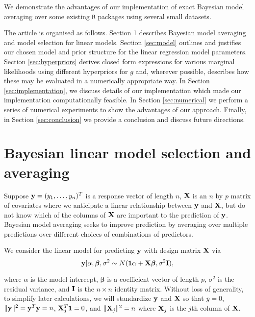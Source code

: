 \documentclass[12pt]{article}
\def\vectorfontone{\bf}
\def\vectorfonttwo{\boldsymbol}
\def\vy{{\vectorfontone y}}                      %
\def\vone{{\vectorfontone 1}}
\def\vbeta{{\vectorfonttwo \beta}}               %
\def\matrixfontone{\bf}
\def\mI{{\matrixfontone I}}                      %
\def\mX{{\matrixfontone X}}                      %
\begin{document}
\noindent 
We demonstrate the advantages of our implementation of exact Bayesian model
averaging over some existing {\tt R}
packages using several small datasets.



The article is organised as follows. Section \ref{sec:bma} describes Bayesian model averaging and model
selection for linear models. Section \ref{sec:model} outlines and justifies our chosen model and prior structure for the linear regression model parameters. Section 
\ref{sec:hyperpriors} derives closed form expressions for various marginal likelihoods using 
different hyperpriors for $g$ and, wherever possible, describes how these may be evaluated in a numerically appropriate way.
In Section \ref{sec:implementation}, we discuss details of our implementation which made our implementation 
computationally feasible.
In Section \ref{sec:numerical} we perform a series of numerical experiments to show the advantages of our approach. 
Finally, in Section \ref{sec:conclusion} we provide a conclusion and discuss future
directions.









 



 
 

\section{Bayesian linear model selection and averaging}
\label{sec:bma}



Suppose $\vy = (y_1,\ldots,y_n)^T$ is a response vector of length $n$, $\mX$ is an $n$ by $p$ matrix 
of covariates where we anticipate a linear relationship between $\vy$ and $\mX$, but do not know
which of the columns of $\mX$ are important to the prediction of $\vy$.
Bayesian model averaging seeks to improve prediction by averaging over multiple
predictions over different choices of combinations of predictors.

We consider the linear model for predicting $\vy$ with design matrix $\mX$ via
\begin{equation}
\label{eq:linearModel}
\vy | \alpha, \vbeta, \sigma^2 \sim N(\vone\alpha + \mX \vbeta, \sigma^2 \mI),
\end{equation} 


\noindent where $\alpha$ is the model intercept, $\vbeta$ is a coefficient vector of length $p$, 
$\sigma^2$ is the residual variance, and $\mI$ is the $n \times n$ identity matrix. 
Without loss of generality, to simplify later calculations, we will standardize $\vy$ and $\mX$ 
so that $\overline{y} = 0$, 
$\|\vy\|^2 = \vy^T\vy = n$, $\mX_j^T\vone = 0$,  and $\|\mX_j\|^2 = n$ where $\mX_j$ is the $j$th 
column of $\mX$. 
\end{document}
